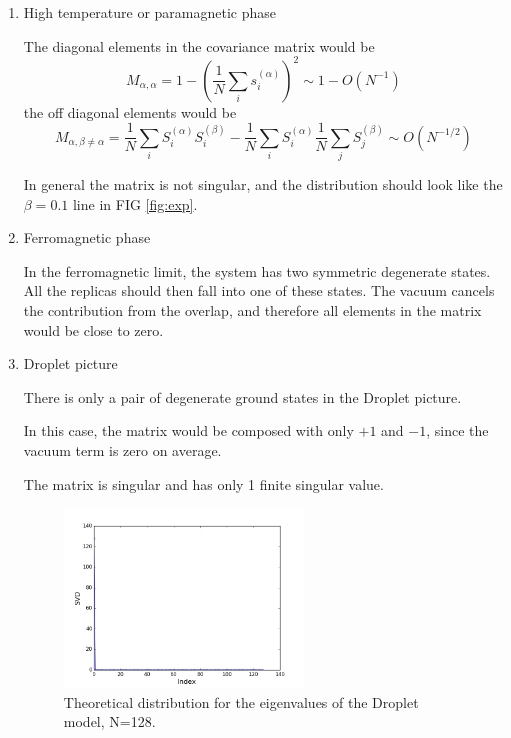 \begin{enumerate}
\item{High temperature or paramagnetic phase}

The diagonal elements in the covariance matrix would be 
\[M_{\alpha,\alpha}=1-(\frac{1}{N}\sum_is_i^{(\alpha)})^2 \sim 1-O(N^{-1})\]
the off diagonal elements would be 
\[M_{\alpha,\beta\neq\alpha}=\frac{1}{N}\sum_iS_i^{(\alpha)}S_i^{(\beta)}-
\frac{1}{N}\sum_iS_i^{(\alpha)}\frac{1}{N}\sum_jS_j^{(\beta)}
\sim O(N^{-1/2})
\]

In general the matrix is not singular, and the distribution should look like the
$\beta=0.1$ line in FIG \ref{fig:exp}.


\item{Ferromagnetic phase}

In the ferromagnetic limit, the system has two symmetric degenerate states.
All the replicas should then fall into one of these states.
The vacuum cancels the contribution from the overlap, and therefore
all elements in the matrix would be close to zero.


\item{Droplet picture}

There is only a pair of degenerate ground states in the Droplet picture. 

In this case, the matrix would be composed with only $+1$ and $-1$, since 
the vacuum term is zero on average.
 
The matrix is singular and has only 1 finite singular value.

\begin{figure}[ht]
  \centering
  \includegraphics[width=0.6\textwidth]{img/matrix/eigDropletTheo.png}
  \caption{Theoretical distribution for the eigenvalues of the Droplet model,
N=128.}
  \label{fig:dropTheo}
\end{figure}






\end{enumerate}
